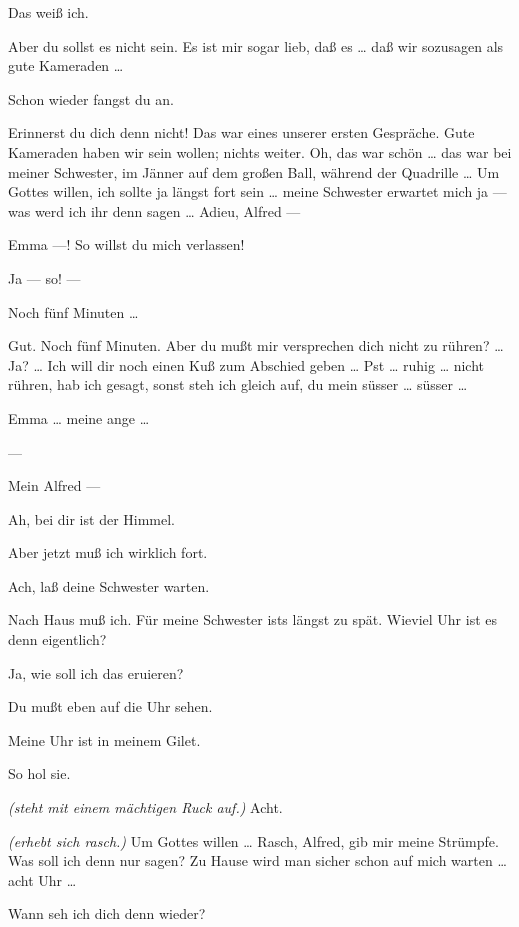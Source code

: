 \documentclass[
	final,
	a4paper,
	ngerman,
	mpinclude = true, %
	twoside = true,
	open = right,
	cleardoublepage = plain,
	DIV = 13,
	BCOR = 1cm,
	titlepage = firstiscover,
	]{scrbook}
\newcommand{\direction}[1]{\textit{(#1)}}
\newcommand{\hiat}{---}
\newcommand{\thecharacter}[1]{\textup{\textsc{#1}}}
\newcommand{\theherr}{\thecharacter{Junger Herr}}
\newcommand{\thefrau}{\thecharacter{Junge Frau}}
\newcommand{\character}[1]{\item[#1:]}
\newcommand{\herr}{\character{\theherr}}
\newcommand{\frau}{\character{\thefrau}}
\begin{document}
\begin{play}
	\herr
	Das weiß ich.

	\frau
	Aber du sollst es nicht sein. Es ist mir sogar lieb, daß es \ldots{} daß wir sozusagen als gute Kameraden \ldots{}

	\herr
	Schon wieder fangst du an.

	\frau
	Erinnerst du dich denn nicht! Das war eines unserer ersten Gespräche. Gute Kameraden haben wir sein wollen; nichts weiter. Oh, das war schön \ldots{} das war bei meiner Schwester, im Jänner auf dem großen Ball, während der Quadrille \ldots{} Um Gottes willen, ich sollte ja längst fort sein \ldots{} meine Schwester erwartet mich ja --- was werd ich ihr denn sagen \ldots{} Adieu, Alfred ---

	\herr
	Emma ---! So willst du mich verlassen!

	\frau
	Ja --- so! ---

	\herr
	Noch fünf Minuten \ldots{}

	\frau
	Gut. Noch fünf Minuten. Aber du mußt mir versprechen dich nicht zu rühren? \ldots{} Ja? \ldots{} Ich will dir noch einen Kuß zum Abschied geben \ldots{} Pst \ldots{} ruhig \ldots{} nicht rühren, hab ich gesagt, sonst steh ich gleich auf, du mein süsser \ldots{} süsser \ldots{}

	\herr
	Emma \ldots{} meine ange \ldots{}

	\hiat

	\frau
	Mein Alfred ---

	\herr
	Ah, bei dir ist der Himmel.

	\frau
	Aber jetzt muß ich wirklich fort.

	\herr
	Ach, laß deine Schwester warten.

	\frau
	Nach Haus muß ich. Für meine Schwester ists längst zu spät. Wieviel Uhr ist es denn eigentlich?

	\herr
	Ja, wie soll ich das eruieren?

	\frau
	Du mußt eben auf die Uhr sehen.

	\herr
	Meine Uhr ist in meinem Gilet.

	\frau
	So hol sie.

	\herr
	\direction{steht mit einem mächtigen Ruck auf.} Acht.

	\frau
	\direction{erhebt sich rasch.} Um Gottes willen \ldots{} Rasch, Alfred, gib mir meine Strümpfe. Was soll ich denn nur sagen? Zu Hause wird man sicher schon auf mich warten \ldots{} acht Uhr \ldots{}

	\herr
	Wann seh ich dich denn wieder?


\end{play}
\end{document}
